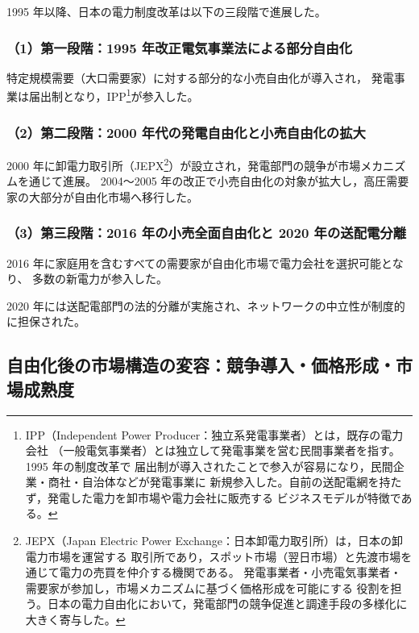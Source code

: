 1995 年以降、日本の電力制度改革は以下の三段階で進展した。

\subsubsection{（1）第一段階：1995 年改正電気事業法による部分自由化}

特定規模需要（大口需要家）に対する部分的な小売自由化が導入され，
発電事業は届出制となり，IPP\footnote{
IPP（Independent Power Producer：独立系発電事業者）とは，既存の電力会社
（一般電気事業者）とは独立して発電事業を営む民間事業者を指す。1995 年の制度改革で
届出制が導入されたことで参入が容易になり，民間企業・商社・自治体などが発電事業に
新規参入した。自前の送配電網を持たず，発電した電力を卸市場や電力会社に販売する
ビジネスモデルが特徴である。
}が参入した。

\subsubsection{（2）第二段階：2000 年代の発電自由化と小売自由化の拡大}

2000 年に卸電力取引所（JEPX\footnote{
JEPX（Japan Electric Power Exchange：日本卸電力取引所）は，日本の卸電力市場を運営する
取引所であり，スポット市場（翌日市場）と先渡市場を通じて電力の売買を仲介する機関である。
発電事業者・小売電気事業者・需要家が参加し，市場メカニズムに基づく価格形成を可能にする
役割を担う。日本の電力自由化において，発電部門の競争促進と調達手段の多様化に大きく寄与した。
}）が設立され，発電部門の競争が市場メカニズムを通じて進展。
2004〜2005 年の改正で小売自由化の対象が拡大し，高圧需要家の大部分が自由化市場へ移行した。

\subsubsection{（3）第三段階：2016 年の小売全面自由化と 2020 年の送配電分離}

2016 年に家庭用を含むすべての需要家が自由化市場で電力会社を選択可能となり、
多数の新電力が参入した。

2020 年には送配電部門の法的分離が実施され、ネットワークの中立性が制度的に担保された。


\subsection{自由化後の市場構造の変容：競争導入・価格形成・市場成熟度}

